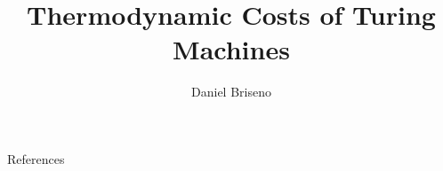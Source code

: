 \documentclass{beamer}
\title{Thermodynamic Costs of Turing Machines \parencite{Kolchinsky_2020}}
\author{Daniel Briseno}
\begin{document}
\frame{\titlepage}










\begin{frame}{References}
    \printbibliography
\end{frame}

 
\end{document}

